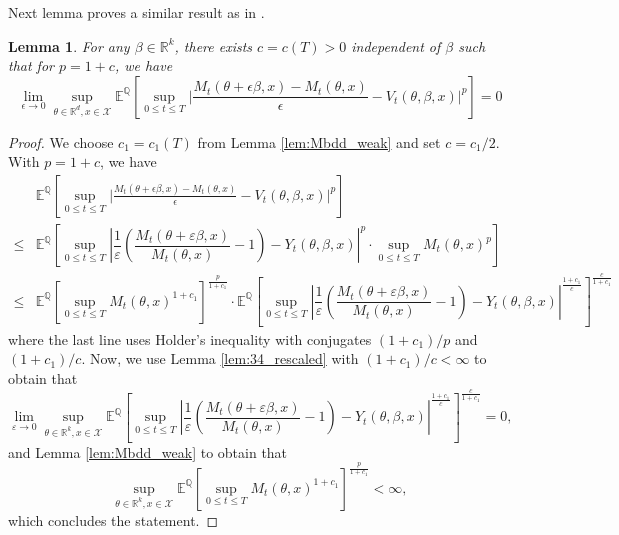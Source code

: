 \documentclass{article}
\newtheorem{lem}[thm]{Lemma}
\newcommand{\eps}{\epsilon}
\newcommand{\1}{\mathbbm{1}}
\newcommand{\E}{\mathbb E}
\renewcommand{\H}{\mathcal{H}}
\numberwithin{equation}{section}
\def\to{\rightarrow}
\def\eps{\varepsilon}
\def\E{{\bf E}} \def\H{{\bf H}} \def\J{{\bf J}}
\def\cX{\mathcal{X}}
\def\d{{\mathrm{d}}}
\def\E{\mathbb{E}}
\def\sE{{\mathbb{E}}}
\def\sQ{{\mathbb{Q}}}
\def\sR{{\mathbb R}}
\begin{document}
Next lemma proves a similar result as in \cite[Lemma 4.7]{carmona2016lectures}.
\begin{lem}\label{lem:34_weak} For any $\beta\in \mathbb{R}^{k}$, there exists $c=c(T)>0$ independent of $\beta$ such that for $p=1+c$, we have
$$\lim_{\epsilon\to 0}\sup_{\theta\in\sR^d,x\in\cX}\sE^\sQ\left[\sup_{0\leq t\leq T}\bigg|\frac{M_t(\theta+\epsilon\beta,x)-M_t(\theta,x)}{\epsilon}-V_t({\theta,\beta},x)\bigg|^p\right]=0$$
\end{lem}
\begin{proof}
We choose $c_{1}=c_{1}(T)$ from Lemma \ref{lem:Mbdd_weak} and set $c=c_{1}/2$. With $p=1+c$, we have
\begin{align*}
&\sE^\sQ\left[\sup_{0\leq t\leq T}\bigg|\frac{M_t(\theta+\epsilon\beta,x)-M_t(\theta,x)}{\epsilon}-V_t({\theta,\beta},x)\bigg|^p\right]\\
\leq &\E^{\sQ}\left[\sup_{0\leq t\leq T}\left|\dfrac{1}{\eps}\left(\dfrac{M_{t}(\theta+\eps\beta, x)}{M_{t}(\theta, x)}-1\right)-Y_{t}(\theta, \beta, x)\right|^{p}\cdot \sup_{0\leq t\leq T}M_{t}(\theta, x)^{p}\right]\\
\leq&\E^{\sQ}\left[\sup_{0\leq t\leq T}M_{t}(\theta, x)^{1+c_{1}}\right]^{\frac{p}{1+c_{1}}}\cdot \E^{\sQ}\left[\sup_{0\leq t\leq T}\left|\dfrac{1}{\eps}\left(\dfrac{M_{t}(\theta+\eps\beta, x)}{M_{t}(\theta, x)}-1\right)-Y_{t}(\theta, \beta, x)\right|^{\frac{1+c_{1}}{c}}\right]^{\frac{c}{1+c_{1}}}
\end{align*}
where the last line uses Holder's inequality with conjugates $(1+c_{1})/p$ and $(1+c_{1})/c$. Now, we use Lemma \ref{lem:34_rescaled} with $(1+c_{1})/c<\infty$ to obtain that
$$\lim_{\eps\to 0}\sup_{\theta\in \mathbb{R}^{k}, x\in \mathcal{X}}\E^{\sQ}\left[\sup_{0\leq t\leq T}\left|\dfrac{1}{\eps}\left(\dfrac{M_{t}(\theta+\eps\beta, x)}{M_{t}(\theta, x)}-1\right)-Y_{t}(\theta, \beta, x)\right|^{\frac{1+c_{1}}{c}}\right]^{\frac{c}{1+c_{1}}}=0,$$
and Lemma \ref{lem:Mbdd_weak} to obtain that
$$\sup_{\theta\in \mathbb{R}^{k}, x\in \mathcal{X}} \E^{\sQ}\left[\sup_{0\leq t\leq T}M_{t}(\theta, x)^{1+c_{1}}\right]^{\frac{p}{1+c_{1}}}<\infty,$$
which concludes the statement.
\end{proof}
\end{document}
